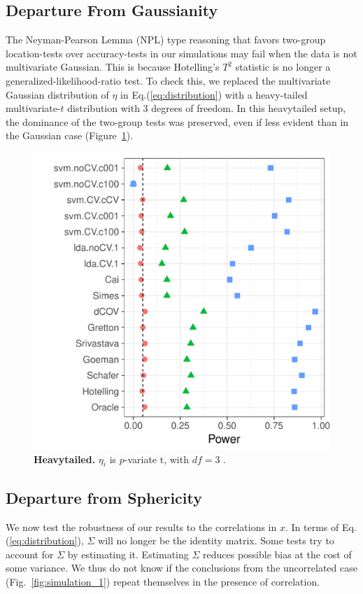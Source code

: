 \documentclass[]{bio}
\begin{document}
\subsection{Departure From Gaussianity}
\label{sec:heavytailed}
The Neyman-Pearson Lemma (NPL) type reasoning that favors two-group location-tests over accuracy-tests in our simulations may fail when the data is not multivariate Gaussian.
This is because Hotelling's $T^2$ statistic is no longer a generalized-likelihood-ratio test. 
To check this, we replaced the multivariate Gaussian distribution of $\eta$ in Eq.(\ref{eq:distribution}) with a heavy-tailed multivariate-$t$ distribution with $3$ degrees of freedom.
In this heavytailed setup, the dominance of the two-group tests was preserved, even if less evident than in the Gaussian case (Figure~\ref{fig:t_null}).



\begin{figure}[th]
	\centering
	\includegraphics[width=0.7\columnwidth]{"art/file9"}
	\caption{\textbf{Heavytailed.} $\eta_i$ is $p$-variate t, with $df=3$ .  } 
	\label{fig:t_null}
\end{figure}




\subsection{Departure from Sphericity}
\label{sec:dependence}

We now test the robustness of our results to the correlations in $x$. 
In terms of Eq.(\ref{eq:distribution}), $\Sigma$ will no longer be the identity matrix. 
Some tests try to account for $\Sigma$ by estimating it. 
Estimating $\Sigma$ reduces possible bias at the cost of some variance. 
We thus do not know if the conclusions from the uncorrelated case (Fig.~\ref{fig:simulation_1}) repeat themselves in the presence of correlation. 
\end{document}
